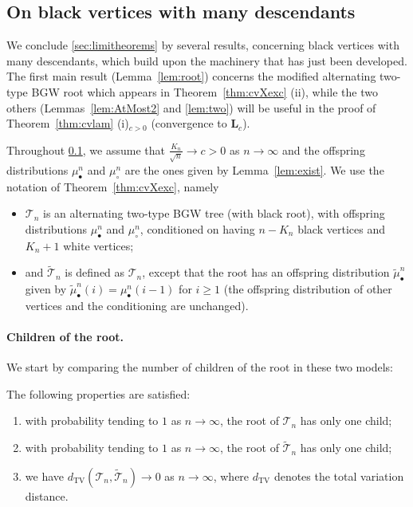 \documentclass[10pt]{amsart}
\theoremstyle{definition}\newtheorem{defi}[theo]{Definition}\newtheorem{rema}[theo]{Remark}\newtheorem{exam}[theo]{Example}\newtheorem{exem}[theo]{Example}\newtheorem{nota}[theo]{Notation}
\def\mub{\mu_{\bullet}}
\def\muc{\mu_{\circ}}
\def\mubn{\mu_{\bullet}^{n}}
\def\mucn{\mu_{\circ}^{n}}
\def\Ts{\mathscr{T}}
\begin{document}
\subsection{On black vertices with many descendants}
\label{ss:descendants}
We conclude \cref{sec:limitheorems} by several results, concerning black vertices with many descendants, which build upon the machinery that has just been developed. The first main result (Lemma~\ref{lem:root}) concerns the modified alternating two-type BGW root which appears in Theorem~\ref{thm:cvXexc} (ii), while the two others (Lemmas~\ref{lem:AtMost2} and \ref{lem:two}) will be useful in the proof of Theorem~\ref{thm:cvlam} (i)$_{c>0}$ (convergence to $\mathbf{L}_{c}$).

Throughout \cref{ss:descendants}, we assume that $ \tfrac{K_{n}}{\sqrt{n}} \rightarrow c>0$ as $n \rightarrow \infty$
and the offspring distributions $\mubn$ and $\mucn$ are the ones given by Lemma~\ref{lem:exist}.
We use the notation of Theorem~\ref{thm:cvXexc}, namely
\begin{itemize}
  \item $\Ts_{n}$ is  an alternating two-type BGW tree (with black root), with offspring distributions $\mub^{n}$ and $\muc^{n}$,
    conditioned on having $n-K_{n}$ black vertices and $K_{n}+1$ white vertices;
  \item  and  $\tilde{\Ts}_{n}$ is defined as $\Ts_{n}$,
     except that the root has an offspring distribution $\widetilde{\mu}^{n}_{\bullet}$
     given by $\widetilde{\mu}^{n}_{\bullet}(i)=\mubn(i-1)$ for $i \geq 1$
     (the offspring distribution of other vertices and the conditioning are unchanged).
\end{itemize}

\paragraph*{Children of the root.}
We start by comparing the number of children of the root in these two models:
\begin{lemma}\label{lem:root}
The following properties are satisfied:
\begin{enumerate}
\item[(i)] with probability tending to $1$ as $n \rightarrow \infty$, the root of $\Ts_{n}$ has only one child;
\item[(ii)] with probability tending to $1$ as $n \rightarrow \infty$, the root of $\tilde{\Ts}_{n}$ has only one child;
\item[(iii)] we have $d_{\mathrm{TV}}(\Ts_{n},\tilde{\Ts}_{n}) \rightarrow 0$ as $n \rightarrow \infty$, where $d_{\mathrm{TV}}$ denotes the total variation distance.
\end{enumerate}
\end{lemma}
\end{document}
